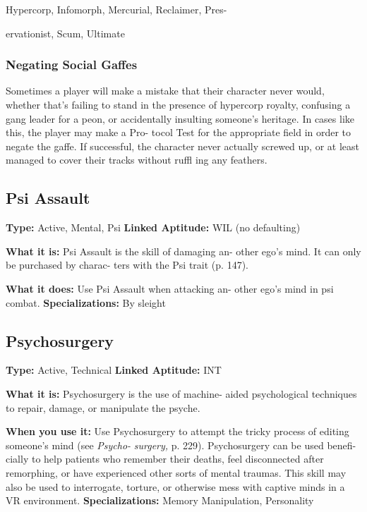 Hypercorp, Infomorph, Mercurial, Reclaimer, Pres-

ervationist, Scum, Ultimate

\subsubsection{Negating Social Gaffes}

Sometimes a player will make a mistake that their 
character never would, whether that's failing to stand 
in the presence of hypercorp royalty, confusing a gang 
leader for a peon, or accidentally insulting someone's 
heritage. In cases like this, the player may make a Pro-
tocol Test for the appropriate field in order to negate 
the gaffe. If successful, the character never actually 
screwed up, or at least managed to cover their tracks 
without ruffl ing any feathers.

\subsection{Psi Assault}

\textbf{Type:} Active, Mental, Psi
\textbf{Linked Aptitude:} WIL (no defaulting)

\textbf{What it is:} Psi Assault is the skill of damaging an-
other ego's mind. It can only be purchased by charac-
ters with the Psi trait (p. 147).

\textbf{What it does:} Use Psi Assault when attacking an-
other ego's mind in psi combat.
\textbf{Specializations:} By sleight

\subsection{Psychosurgery}

\textbf{Type:} Active, Technical
\textbf{Linked Aptitude:} INT

\textbf{What it is:} Psychosurgery is the use of machine-
aided psychological techniques to repair, damage, or 
manipulate the psyche.

\textbf{When you use it:} Use Psychosurgery to attempt the 
tricky process of editing someone's mind (see \textit{Psycho-}
\textit{surgery,} p. 229). Psychosurgery can be used benefi-
cially to help patients who remember their deaths, feel 
disconnected after remorphing, or have experienced 
other sorts of mental traumas. This skill may also be 
used to interrogate, torture, or otherwise mess with 
captive minds in a VR environment.
\textbf{Specializations:} Memory Manipulation, Personality 

